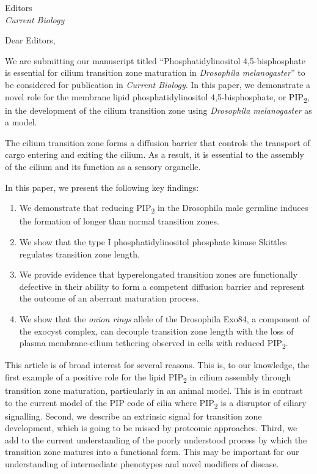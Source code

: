 \documentclass[12pt, twoside, letterpaper]{letter}
\date{\small \today}
\newcommand{\PIP}{PIP\textsubscript{2}}
\begin{document}
\begin{letter}{Editors \\
    \textit{Current Biology}}

\opening{Dear Editors,}

We are submitting our manuscript titled
``Phosphatidylinositol 4,5-bisphosphate is essential for
cilium transition zone maturation in \textit{Drosophila melanogaster}''
to be considered for publication in \textit{Current Biology}.
In this paper, we demonstrate a novel role for the membrane lipid
phosphatidylinositol 4,5-bisphosphate, or \PIP{},
in the development of the cilium transition zone using
\textit{Drosophila melanogaster} as a model.

The cilium transition zone forms a diffusion barrier that controls
the transport of cargo entering and exiting the cilium.
As a result, it is essential to the assembly of the cilium
and its function as a sensory organelle.

In this paper, we present the following key findings:
\begin{enumerate}
\item We demonstrate that reducing \PIP{} in the Drosophila male germline
  induces the formation of longer than normal transition zones.
\item We show that the type I phosphatidylinositol phosphate kinase
  Skittles regulates transition zone length.
\item We provide evidence that hyperelongated transition zones are
  functionally defective in their ability to form a competent diffusion barrier
  and represent the outcome of an aberrant maturation process.
\item We show that the \textit{onion rings} allele of the Drosophila Exo84,
  a component of the exocyst complex, can decouple transition zone length
  with the loss of plasma membrane-cilium tethering observed in cells
  with reduced \PIP{}.
\end{enumerate}

This article is of broad interest for several reasons.
This is, to our knowledge, the first example of a positive role for the lipid
\PIP{} in cilium assembly through transition zone maturation,
particularly in an animal model.
This is in contrast to the current model
of the PIP code of cilia where \PIP{} is a disruptor of ciliary signalling.
Second, we describe an extrinsic signal for transition zone
development, which is going to be missed by proteomic approaches.
Third, we add to the current understanding of the poorly understood
process by which the transition zone matures into a functional form.
This may be important for our understanding of intermediate phenotypes
and novel modifiers of disease.


\end{letter}
\end{document}
